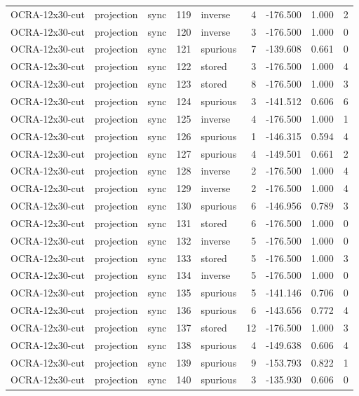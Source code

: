 \begin{tabular}{lllrlrrrr}
OCRA-12x30-cut & projection & sync & 119 & inverse & 4 & -176.500 & 1.000 & 2 \\
OCRA-12x30-cut & projection & sync & 120 & inverse & 3 & -176.500 & 1.000 & 0 \\
OCRA-12x30-cut & projection & sync & 121 & spurious & 7 & -139.608 & 0.661 & 0 \\
OCRA-12x30-cut & projection & sync & 122 & stored & 3 & -176.500 & 1.000 & 4 \\
OCRA-12x30-cut & projection & sync & 123 & stored & 8 & -176.500 & 1.000 & 3 \\
OCRA-12x30-cut & projection & sync & 124 & spurious & 3 & -141.512 & 0.606 & 6 \\
OCRA-12x30-cut & projection & sync & 125 & inverse & 4 & -176.500 & 1.000 & 1 \\
OCRA-12x30-cut & projection & sync & 126 & spurious & 1 & -146.315 & 0.594 & 4 \\
OCRA-12x30-cut & projection & sync & 127 & spurious & 4 & -149.501 & 0.661 & 2 \\
OCRA-12x30-cut & projection & sync & 128 & inverse & 2 & -176.500 & 1.000 & 4 \\
OCRA-12x30-cut & projection & sync & 129 & inverse & 2 & -176.500 & 1.000 & 4 \\
OCRA-12x30-cut & projection & sync & 130 & spurious & 6 & -146.956 & 0.789 & 3 \\
OCRA-12x30-cut & projection & sync & 131 & stored & 6 & -176.500 & 1.000 & 0 \\
OCRA-12x30-cut & projection & sync & 132 & inverse & 5 & -176.500 & 1.000 & 0 \\
OCRA-12x30-cut & projection & sync & 133 & stored & 5 & -176.500 & 1.000 & 3 \\
OCRA-12x30-cut & projection & sync & 134 & inverse & 5 & -176.500 & 1.000 & 0 \\
OCRA-12x30-cut & projection & sync & 135 & spurious & 5 & -141.146 & 0.706 & 0 \\
OCRA-12x30-cut & projection & sync & 136 & spurious & 6 & -143.656 & 0.772 & 4 \\
OCRA-12x30-cut & projection & sync & 137 & stored & 12 & -176.500 & 1.000 & 3 \\
OCRA-12x30-cut & projection & sync & 138 & spurious & 4 & -149.638 & 0.606 & 4 \\
OCRA-12x30-cut & projection & sync & 139 & spurious & 9 & -153.793 & 0.822 & 1 \\
OCRA-12x30-cut & projection & sync & 140 & spurious & 3 & -135.930 & 0.606 & 0 \\

\end{tabular}
